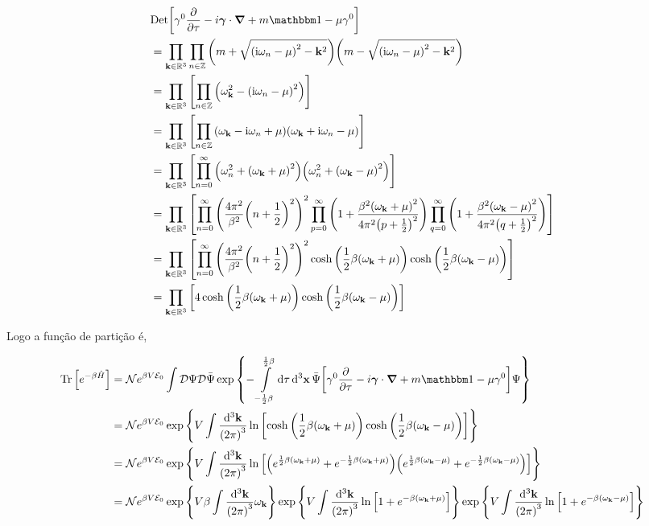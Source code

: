 \documentclass[twoside]{amsart}
\newcommand{\Dd}[1]{\mathcal D #1}
\newcommand{\Det}[1]{\textup{Det} #1}
\numberwithin{equation}{section}
\begin{document}
\begin{align}
    &\Det\qty[\gamma^0 \pdv{}{\tau}-i\boldsymbol{\gamma}\cdot \grad+m\mathbbm 1-\mu\gamma^0]\\
    &=\prod\limits_{\vb k\in\mathbb R^3}\prod\limits_{n\in\mathbb Z}\qty(m+\sqrt{\qty(\im\omega_n-\mu)^2-\vb k^2})\qty(m-\sqrt{\qty(\im\omega_n-\mu)^2-\vb k^2})\\
    &=\prod\limits_{\vb k\in\mathbb R^3}\qty[\prod\limits_{n\in\mathbb Z}\qty(\omega_{\vb k}^2-\qty(\im\omega_n-\mu)^2)]\\
    &=\prod\limits_{\vb k\in\mathbb R^3}\qty[\prod\limits_{n\in\mathbb Z}\qty(\omega_{\vb k}-\im\omega_n+\mu)\qty(\omega_{\vb k}+\im\omega_n-\mu)]\\
    &=\prod\limits_{\vb k\in\mathbb R^3}\qty[\prod\limits_{n=0}^{\infty}\qty(\omega_n^2+\qty(\omega_{\vb k}+\mu)^2)\qty(\omega_n^2+\qty(\omega_{\vb k}-\mu)^2)]\\
    &=\prod\limits_{\vb k\in\mathbb R^3}\qty[\prod\limits_{n=0}^\infty\qty(\frac{4\pi^2}{\beta^2}\qty(n+\frac12)^2)^2\prod\limits_{p=0}^{\infty}\qty(1+\frac{\beta^2\qty(\omega_{\vb k}+\mu)^2}{4\pi^2\qty(p+\frac12)^2})\prod\limits_{q=0}^{\infty}\qty(1+\frac{\beta^2\qty(\omega_{\vb k}-\mu)^2}{4\pi^2\qty(q+\frac12)^2})]\\
    &=\prod\limits_{\vb k\in\mathbb R^3}\qty[\prod\limits_{n=0}^\infty\qty(\frac{4\pi^2}{\beta^2}\qty(n+\frac12)^2)^2\cosh\qty(\frac12\beta\qty(\omega_{\vb k}+\mu))\cosh\qty(\frac12\beta\qty(\omega_{\vb k}-\mu))]\\
    &=\prod\limits_{\vb k\in\mathbb R^3}\qty[4\cosh\qty(\frac12\beta\qty(\omega_{\vb k}+\mu))\cosh\qty(\frac12\beta\qty(\omega_{\vb k}-\mu))]
\end{align} 

Logo a função de partição é,

\begin{align}
    \Tr\qty[e^{-\beta\hat H}]&=\mathcal Ne^{\beta V\mathcal E_0}\int\Dd{\Psi}\Dd{\bar\Psi}\exp\qty{-\int\limits_{-\frac12\beta}^{\frac12\beta}\dd{\tau}\dd[3]{\vb x}\bar\Psi\qty[\gamma^0 \pdv{}{\tau}-i\boldsymbol{\gamma}\cdot \grad+m\mathbbm 1-\mu\gamma^0]\Psi}\\
    &=\mathcal Ne^{\beta V\mathcal E_0}\exp\qty{V\int\frac{\dd[3]{\vb k}}{\qty(2\pi)^3}\ln\qty[\cosh\qty(\frac12\beta\qty(\omega_{\vb k}+\mu))\cosh\qty(\frac12\beta\qty(\omega_{\vb k}-\mu))]}\\
    &=\mathcal Ne^{\beta V\mathcal E_0}\exp\qty{V\int\frac{\dd[3]{\vb k}}{\qty(2\pi)^3}\ln\qty[\qty(e^{\frac12\beta\qty(\omega_{\vb k}+\mu)}+e^{-\frac12\beta\qty(\omega_{\vb k}+\mu)})\qty(e^{\frac12\beta\qty(\omega_{\vb k}-\mu)}+e^{-\frac12\beta\qty(\omega_{\vb k}-\mu)})]}\\
    &=\mathcal Ne^{\beta V\mathcal E_0}\exp\qty{V\beta\int\frac{\dd[3]{\vb k}}{\qty(2\pi)^3}\omega_{\vb k}}\exp\qty{V\int\frac{\dd[3]{\vb k}}{\qty(2\pi)^3}\ln\qty[1+e^{-\beta\qty(\omega_{\vb k}+\mu)}]}\exp\qty{V\int\frac{\dd[3]{\vb k}}{\qty(2\pi)^3}\ln\qty[1+e^{-\beta\qty(\omega_{\vb k}-\mu)}]}
\end{align}
\end{document}
